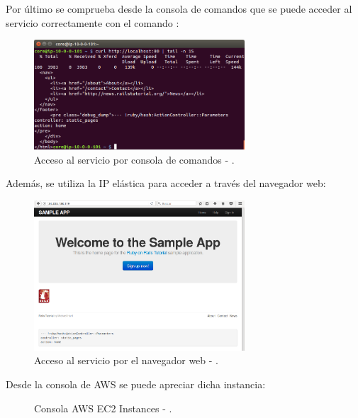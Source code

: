 Por último se comprueba desde la consola de comandos que se puede acceder al servicio correctamente con el comando :


\begin{figure}[H]
\centering
\includegraphics[width=0.7\textwidth]{images/figures/curl-aws-1.png}
\caption{Acceso al servicio por consola de comandos - .\label{fig:figure_placement_example}}
\end{figure}

Además, se utiliza la IP elástica para acceder a través del navegador web:

\begin{figure}[H]
\centering
\includegraphics[width=0.7\textwidth]{images/figures/access-aws-1.png}
\caption{Acceso al servicio por el navegador web - .\label{fig:figure_placement_example}}
\end{figure}

Desde la consola de AWS se puede apreciar dicha instancia:

\begin{figure}[H]
\caption{Consola AWS EC2 Instances - .\label{fig:figure_placement_example}}
\end{figure}

